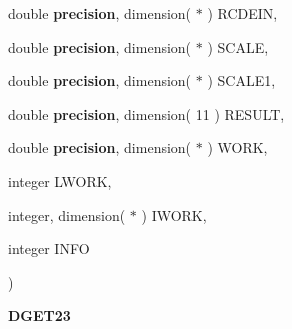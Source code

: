 {\begin{DoxyParamCaption}
\item[{double {\bf precision}, dimension( $\ast$ )}]{R\+C\+D\+E\+I\+N, }
\item[{double {\bf precision}, dimension( $\ast$ )}]{S\+C\+A\+L\+E, }
\item[{double {\bf precision}, dimension( $\ast$ )}]{S\+C\+A\+L\+E1, }
\item[{double {\bf precision}, dimension( 11 )}]{R\+E\+S\+U\+L\+T, }
\item[{double {\bf precision}, dimension( $\ast$ )}]{W\+O\+R\+K, }
\item[{integer}]{L\+W\+O\+R\+K, }
\item[{integer, dimension( $\ast$ )}]{I\+W\+O\+R\+K, }
\item[{integer}]{I\+N\+F\+O}
\end{DoxyParamCaption}
)}\label{group__double__eig_gaa52ccc18dfdd08a5c0af32a0bb689f6c}


{\bfseries D\+G\+E\+T23} 


